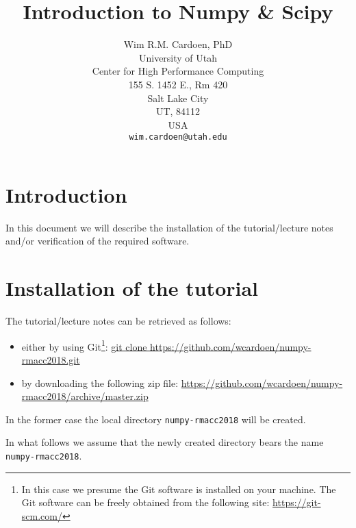 \documentclass[11pt]{article}
\begin{document}
\title{Introduction to Numpy \& Scipy}
\author{Wim R.M. Cardoen, PhD\\
        University of Utah\\
        Center for High Performance Computing\\
        155 S. 1452 E., Rm 420\\
        Salt Lake City\\
        UT, 84112\\
        USA\\
        \texttt{wim.cardoen@utah.edu}}
\renewcommand{\today}{Aug. 7, 2018}
\renewcommand{\labelitemii}{$\star$}
\maketitle

\section*{Introduction}
In this document we will describe the installation of the tutorial/lecture notes 
and/or verification of the required software.

\renewcommand \thesection{\Roman{section}}
\section{Installation of the tutorial}
The tutorial/lecture notes can be retrieved as follows:
\begin{itemize}
\item either by using Git\footnote{In this case we presume the Git software is installed on your machine. The Git software can be freely obtained from the following site: \href{https://git-scm.com/}{https://git-scm.com/}}:\newline
      \href{git clone https://github.com/wcardoen/numpy-rmacc2018.git}{git clone https://github.com/wcardoen/numpy-rmacc2018.git}
\item by downloading the following zip file:\newline
   \href{https://github.com/wcardoen/numpy-rmacc2018/archive/master.zip}{https://github.com/wcardoen/numpy-rmacc2018/archive/master.zip}
\end{itemize}
In the former case the local directory \texttt{numpy-rmacc2018} 
will be created. 

In what follows we assume that the newly created directory bears the name \texttt{numpy-rmacc2018}.  
\end{document}
